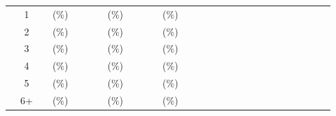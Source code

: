 \documentclass[a4paper 12pt]{article}
\numberwithin{equation}{section}
\begin{document}
\begin{tiny}
\begin{table}[h!]
\begin{tabular}{ccccccccccccccccccccccccccc}
\raisebox{1.5ex}{\bf saithe} & 1&  & ($ \%$) & & &  & ($ \%$) & & &  &  ($ \%$) \\[1ex]
& 2  &  &  ($ \%$) & & &  &  ($ \%$) & & & &  ($ \%$) \\[1ex]
& 3  &  &  ($ \%$) & & &  &  ($ \%$) & & & &  ($ \%$) \\[1ex]
& 4  &  &  ($ \%$) & & &  &  ($ \%$) & & & &  ($ \%$) \\[1ex]
& 5  &  &  ($ \%$) & & &  &  ($ \%$) & & & &  ($ \%$) \\[1ex]
& 6+ &  &  ($ \%$) & & &  &  ($ \%$) & & & &  ($ \%$)\\[0.5ex]

\hline
\end{tabular}
\end{table}
\end{tiny}


\end{document}
